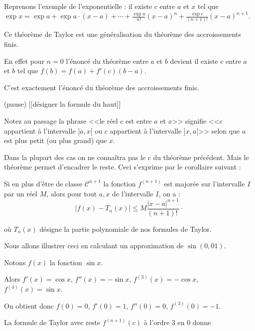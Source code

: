 \change

\change

Reprenons l'exemple de l'exponentielle :
 il existe $c$ entre $a$ et $x$ tel que 
$\exp x=\exp a+\exp a \cdot (x-a)+\cdots+\frac{\exp a}{n!}(x-a)^n+\frac{\exp c}{(n+1)!}(x-a)^{n+1}.$  


\change

Ce théorème de Taylor est une généralisation du théorème des accroissements finis.

\change

En effet pour $n=0$  l'énoncé du théorème entre $a$ et $b$ devient
il existe $c$ entre $a$ et $b$ tel que $f(b)=f(a)+f'(c)(b-a)$.


C'est exactement l'énoncé du théorème des accroissements finis.

(pause) [[désigner la formule du haut]]

Notez au passage la phrase 
 <<le réel $c$ est entre $a$ et $x$>> signifie <<$c$ appartient à l'intervalle $]a,x[$ ou $c$ appartient 
à l'intervalle $]x,a[$>> selon que  $a$ est plus petit (ou plus grand) que $x$.




\diapo

Dans la plupart des cas on ne connaîtra pas le $c$ du théorème précédent. Mais le théorème permet d'encadrer le reste.
Ceci s'exprime par le corollaire suivant :


Si en plus d'être de classe $\mathcal{C}^{n+1}$
la fonction $f^{(n+1)}$ est majorée sur l'intervalle $I$ par un réel $M$, 
alors pour tout $a, x$ de l'intervalle $I$, on a : 
\[
\big|f(x)-T_n(x)\big|\le M\frac{|x-a|^{n+1}}{(n+1)! \ } \cdotp
\]

où $T_n(x)$ désigne la partie polynomiale de nos formules de Taylor.

\change

Nous allons illustrer ceci en calculant un approximation de $\sin(0,01)$.

Notons $f(x)$ la fonction $\sin x$. 

\change

Alors $f'(x)=\cos x$, $f''(x)=-\sin x$, $f^{(3)}(x)=-\cos x$, $f^{(4)}(x)=\sin x$.

\change

On obtient donc $f(0)=0$, $f'(0)=1$, $f''(0)=0$, $f^{(3)}(0)=-1$.

\change

La formule de Taylor avec reste $f^{(n+1)}(c)$ à l'ordre $3$ en $0$ 
donne 

